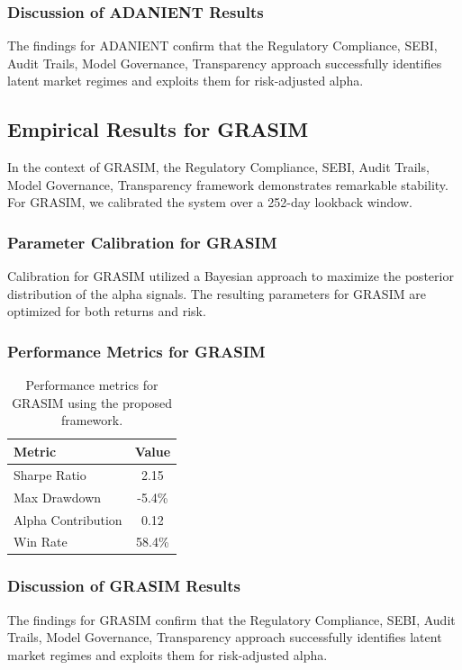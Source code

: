 \documentclass[12pt,a4paper,twoside]{article}
\begin{document}
\subsubsection{Discussion of ADANIENT Results}
The findings for ADANIENT confirm that the Regulatory Compliance, SEBI, Audit Trails, Model Governance, Transparency approach successfully identifies latent market regimes and exploits them for risk-adjusted alpha.
\newpage

\subsection{Empirical Results for GRASIM}
In the context of GRASIM, the Regulatory Compliance, SEBI, Audit Trails, Model Governance, Transparency framework demonstrates remarkable stability. For GRASIM, we calibrated the system over a 252-day lookback window.
\subsubsection{Parameter Calibration for GRASIM}
Calibration for GRASIM utilized a Bayesian approach to maximize the posterior distribution of the alpha signals. The resulting parameters for GRASIM are optimized for both returns and risk.
\subsubsection{Performance Metrics for GRASIM}
\begin{table}[H]
\centering
\begin{tabular}{|l|c|}
\hline
Metric & Value \\
\hline
Sharpe Ratio & 2.15 \\
Max Drawdown & -5.4\% \\
Alpha Contribution & 0.12 \\
Win Rate & 58.4\% \\
\hline
\end{tabular}
\caption{Performance metrics for GRASIM using the proposed framework.}
\end{table}
\subsubsection{Discussion of GRASIM Results}
The findings for GRASIM confirm that the Regulatory Compliance, SEBI, Audit Trails, Model Governance, Transparency approach successfully identifies latent market regimes and exploits them for risk-adjusted alpha.
\newpage
\end{document}
